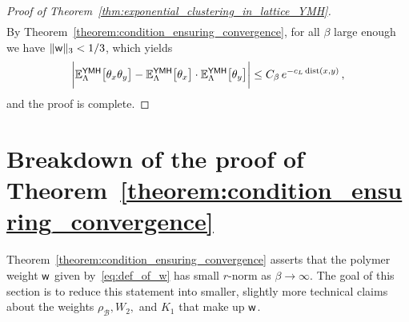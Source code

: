\documentclass[11pt]{article}
\theoremstyle{definition}
\theoremstyle{remark}
\numberwithin{theorem}{section}
\newcommand{\bE}{\mathbb E}
\begin{document}
\begin{proof}[Proof of Theorem~\ref{thm:exponential_clustering_in_lattice_YMH}]
\begin{align*}
        \end{align*}
        By Theorem~\ref{theorem:condition_ensuring_convergence}, for all $\beta$ large enough we have $\|{\sf w}\|_3 < 1/3$, which yields
        \[
        \bigg|\bE_{\Lambda}^{\sf YMH}\big[\theta_x \theta_y\big] - \bE_{\Lambda}^{\sf YMH}\big[\theta_x \big]\cdot \bE_{\Lambda}^{\sf YMH}\big[ \theta_y\big] \bigg| \le C_\beta  \, e^{-c_L \, \text{dist}(x,y)} \, , 
        \]
        and the proof is complete. 
    \end{proof}
    
    \section{Breakdown of the proof of Theorem~\ref{theorem:condition_ensuring_convergence}}
    \label{sec:breakdown_of_proof_condition_ensuring_convergence}
    Theorem~\ref{theorem:condition_ensuring_convergence} asserts that the polymer weight ${\sf w}$ given by~\eqref{eq:def_of_w} has small $r$-norm as $\beta\to \infty$. The goal of this section is to reduce this statement into smaller, slightly more technical claims about the weights $\rho_{\mathcal{B}}, W_2,$ and $K_1$ that make up ${\sf w}$. 
    
\end{document}
